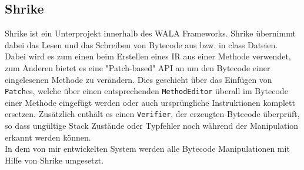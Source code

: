 \subsection{Shrike}

Shrike ist ein Unterprojekt innerhalb des WALA Frameworks. Shrike übernimmt dabei das Lesen und das 
Schreiben von Bytecode aus bzw. in class Dateien. Dabei wird es zum einen beim Erstellen eines IR aus einer 
Methode verwendet, zum Anderen bietet es eine "Patch-based" API an um den Bytecode einer eingelesenen 
Methode zu verändern. Dies geschieht über das Einfügen von \texttt{Patch}es, welche über einen 
entsprechenden \texttt{MethodEditor} überall im Bytecode einer Methode eingefügt werden oder auch 
ursprüngliche Instruktionen komplett ersetzen. Zusätzlich enthält es einen \texttt{Verifier}, der erzeugten 
Bytecode überprüft, so dass ungültige Stack Zustände oder Typfehler noch während der Manipulation erkannt 
werden können. 
\\
In dem von mir entwickelten System werden alle Bytecode Manipulationen mit Hilfe von Shrike umgesetzt. 

